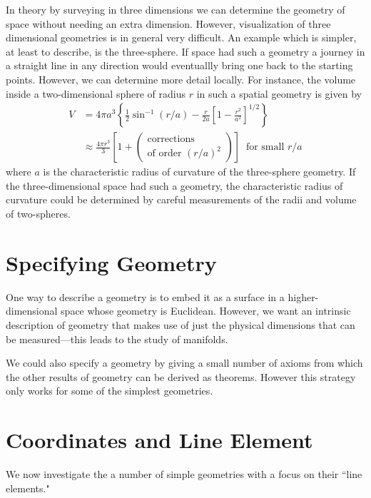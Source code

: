 In theory by surveying in three dimensions we can determine the geometry of space without needing an extra dimension. However, visualization of three dimensional geometries is in general very difficult. An example which is simpler, at least to describe, is the three-sphere. If space had such a geometry a journey in a straight line in any direction would eventuallly bring one back to the starting points. However, we can determine more detail locally. For instance, the volume inside a two-dimensional sphere of radius $r$ in such a spatial geometry is given by \begin{align*}
    V &= 4\pi a^3\left\{\frac{1}{2}\sin^{-1}(r/a)-\frac{r}{2a}\left[1-\frac{r^2}{a^2}\right]^{1/2}\right\} \\
    &\approx \frac{4\pi r^3}{3}\left[1+\left(\begin{array}{c} \text{corrections} \\ \text{of order }(r/a)^2\end{array}\right)\right]\;\;\text{for small $r/a$} 
\end{align*}
where $a$ is the characteristic radius of curvature of the three-sphere geometry. If the three-dimensional space had such a geometry, the characteristic radius of curvature could be determined by careful measurements of the radii and volume of two-spheres.

\section{Specifying Geometry}
\label{sec:specGeom}

One way to describe a geometry is to embed it as a surface in a higher-dimensional space whose geometry is Euclidean. However, we want an intrinsic description of geometry that makes use of just the physical dimensions that can be measured---this leads to the study of manifolds.

We could also specify a geometry by giving a small number of axioms from which the other results of geometry can be derived as theorems. However this strategy only works for some of the simplest geometries.


\section{Coordinates and Line Element}
\label{sec:coordLineElem}

We now investigate the a number of simple geometries with a focus on their ``line elements."


